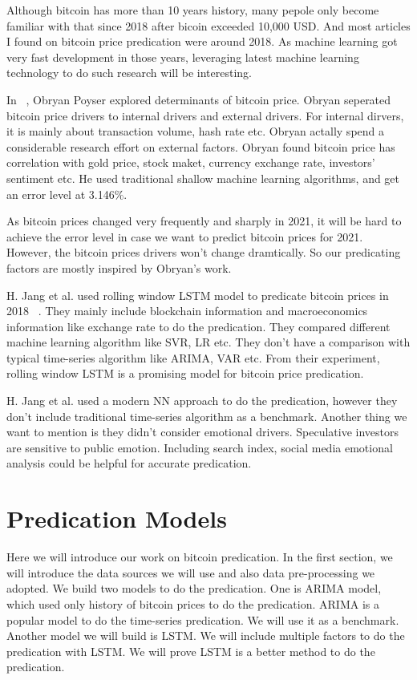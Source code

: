 \documentclass[10pt,twocolumn,letterpaper]{article}
\begin{document}
Although bitcoin has more than 10 years history, many pepole only become familiar with that since 2018 after bicoin exceeded 10,000 USD. 
And most articles I found on bitcoin price predication were around 2018. As machine learning got very fast development in those years, 
leveraging latest machine learning technology to do such research will be interesting.

In ~\cite{Authors05}, Obryan Poyser explored determinants of bitcoin price. Obryan seperated bitcoin price drivers to internal drivers and external drivers.
For internal dirvers, it is mainly about transaction volume, hash rate etc. Obryan actally spend a considerable research effort on external factors. 
Obryan found bitcoin price has correlation with gold price, stock maket, currency exchange rate, investors' sentiment etc. He used traditional 
shallow machine learning algorithms, and get an error level at 3.146$\%$.

As bitcoin prices changed very frequently and sharply in 2021, it will be hard to achieve the error level in case we want to predict bitcoin prices
for 2021. However, the bitcoin prices drivers won't change dramtically. So our predicating factors are mostly inspired by Obryan's work.


H. Jang et al. used rolling window LSTM model to predicate bitcoin prices in 2018 ~\cite{Authors06}. They mainly include blockchain information and macroeconomics information like exchange rate to do the predication. They compared different machine learning algorithm like SVR, LR etc. They don't have a comparison with typical time-series algorithm like ARIMA, VAR etc. From their experiment, rolling window LSTM is a promising model for bitcoin price predication.

H. Jang et al. used a modern NN approach to do the predication, however they don't include  traditional time-series algorithm as a benchmark. Another thing we want to mention is they didn't consider emotional drivers. Speculative investors are sensitive to public emotion. Including search index, social media emotional analysis could be helpful for accurate predication.




\section{Predication Models}
Here we will introduce our work on bitcoin predication. In the first section, we will introduce the data sources we will use and also data pre-processing we adopted. We build two models to do the predication. One is ARIMA model, which used only history of bitcoin prices to do the predication. ARIMA is a popular model to do the time-series predication. We will use it as a benchmark. Another model we will build is LSTM. We will include multiple factors to do the predication with LSTM. We will prove LSTM is a better method to do the predication.
\end{document}
